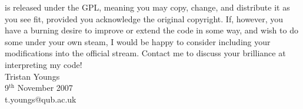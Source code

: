 \documentclass[a4paper,10pt]{report}
\begin{document}
\progname{} is released under the GPL, meaning you may copy, change, and distribute it as you see fit, provided you acknowledge the original copyright. If, however, you have a burning desire to improve or extend the code in some way, and wish to do some under your own steam, I would be happy to consider including your modifications into the official stream. Contact me to discuss your brilliance at interpreting my code!\\

Tristan Youngs\\
9$^\textrm{th}$ November 2007\\
t.youngs@qub.ac.uk\\












\printindex
\end{document}
